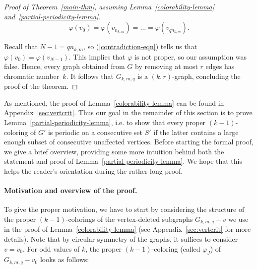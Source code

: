\documentclass[a4paper,10pt,hidelinks]{amsart}
\renewcommand{\phi}{\ensuremath{\varphi}}
\theoremstyle{definition}
\begin{document}
\begin{proof}[Proof of Theorem~\ref{main-thm}, assuming Lemma~\ref{colorability-lemma} and~\ref{partial-periodicity-lemma}]
        \begin{equation}\label{contradiction-eqn}
            \varphi(v_0) = \varphi(v_{n_{k,m}}) = \dots = \varphi(v_{qn_{k,m}}).
        \end{equation}

        Recall that $N-1 = qn_{k,m}$, so (\ref{contradiction-eqn}) tells us that $\varphi(v_{0}) = \varphi(v_{N-1})$. This implies that $\varphi$ is not proper, so our assumption was false. Hence, every graph obtained from $G$ by removing at most $r$ edges has chromatic number~$k$. It follows that $G_{k,m,q}$ is a $(k,r)$-graph, concluding the proof of the theorem.
    \end{proof}

As mentioned, the proof of Lemma~\ref{colorability-lemma} can be found in Appendix~\ref{sec:vertcrit}. Thus our goal in the remainder of this section is to prove Lemma~\ref{partial-periodicity-lemma}, i.e. to show that every proper $(k-1)$-coloring of $G'$ is periodic on a consecutive set $S'$ if the latter contains a large enough subset of consecutive unaffected vertices. Before starting the formal proof, we give a brief overview, providing some more intuition behind both the statement and proof of Lemma~\ref{partial-periodicity-lemma}. We hope that this helps the reader's orientation during the rather long proof. 

\medskip

\paragraph*{\textbf{Motivation and overview of the proof.}} To give the proper motivation, we have to start by considering the structure of the proper $(k-1)$-colorings of the vertex-deleted subgraphs $G_{k,m,q}-v$ we use in the proof of Lemma~\ref{colorability-lemma} (see Appendix~\ref{sec:vertcrit} for more details). Note that by circular symmetry of the graphs, it suffices to consider $v=v_0$. For odd values of $k$, the proper $(k-1)$-coloring (called $\phi_J$) of $G_{k,m,q}-v_0$ looks as follows:
\end{document}

